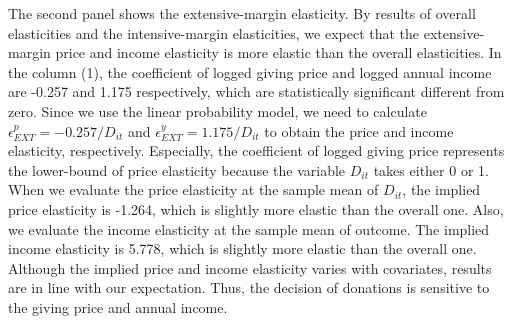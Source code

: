 \documentclass[
  11pt,
  a4paper,
]{article}
\begin{document}
  The second panel shows the extensive-margin elasticity.
  By results of overall elasticities and the intensive-margin elasticities,
  we expect that the extensive-margin price and income elasticity is more elastic than the overall elasticities.
  In the column (1), the coefficient of logged giving price and logged annual income are -0.257 and 1.175 respectively,
  which are statistically significant different from zero.
  Since we use the linear probability model,
  we need to calculate \(\epsilon^p_{EXT} = -0.257/D_{it}\) and \(\epsilon^y_{EXT} = 1.175/D_{it}\)
  to obtain the price and income elasticity, respectively.
  Especially, the coefficient of logged giving price represents the lower-bound of price elasticity
  because the variable \(D_{it}\) takes either 0 or 1.
  When we evaluate the price elasticity at the sample mean of \(D_{it}\),
  the implied price elasticity is -1.264, which is slightly more elastic than the overall one.
  Also, we evaluate the income elasticity at the sample mean of outcome.
  The implied income elasticity is 5.778, which is slightly more elastic than the overall one.
  Although the implied price and income elasticity varies with covariates,
  results are in line with our expectation.
  Thus, the decision of donations is sensitive to the giving price and annual income.
\end{document}
